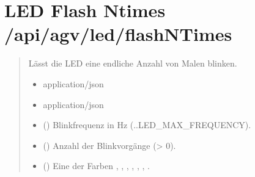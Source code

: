 \documentclass[letterpaper,10pt,english]{sphinxmanual}
\begin{document}
\section{LED Flash N\sphinxhyphen{}times \textendash{} /api/agv/led/flashNTimes}
\label{\detokenize{agv_rest_api_led:led-flash-n-times-api-agv-led-flashntimes}}\label{\detokenize{agv_rest_api_led:post-api-agv-led-flashntimes}}

\begin{fulllineitems}
\label{\detokenize{agv_rest_api_led:post--api-agv-led-flashNTimes}}
\pysigstartsignatures
\pysigline
{}
\pysigstopsignatures\begin{quote}\begin{description}
\sphinxAtStartPar
Lässt die LED eine endliche Anzahl von Malen blinken.

\begin{itemize}
\item {} 
\sphinxAtStartPar
{} \textendash{} application/json

\end{itemize}

\begin{itemize}
\item {} 
\sphinxAtStartPar
{} \textendash{} application/json

\end{itemize}

\begin{itemize}
\item {} 
\sphinxAtStartPar
{} () \textendash{} Blinkfrequenz in Hz (..\textasciigrave{}\textasciigrave{}LED\_MAX\_FREQUENCY\textasciigrave{}\textasciigrave{}).

\item {} 
\sphinxAtStartPar
{} () \textendash{} Anzahl der Blinkvorgänge (\textgreater{} 0).

\item {} 
\sphinxAtStartPar
{} () \textendash{} Eine der Farben , , , , , , .


\end{itemize}
\end{description}
\end{quote}
\end{fulllineitems}
\end{document}
